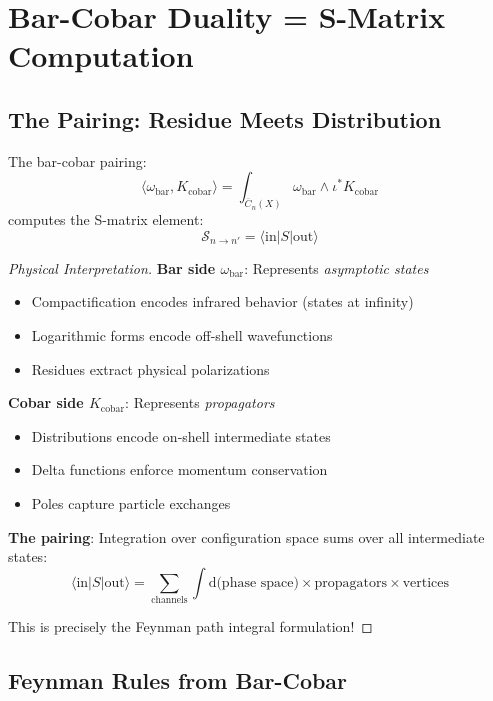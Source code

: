 \section{Bar-Cobar Duality = S-Matrix Computation}

\subsection{The Pairing: Residue Meets Distribution}

\begin{theorem}\label{thm:physical-pairing}
The bar-cobar pairing:
$$\langle \omega_{\text{bar}}, K_{\text{cobar}} \rangle = 
\int_{\overline{C}_n(X)} \omega_{\text{bar}} \wedge \iota^* K_{\text{cobar}}$$
computes the S-matrix element:
$$\mathcal{S}_{n \to n'} = \langle \text{in} | S | \text{out} \rangle$$
\end{theorem}

\begin{proof}[Physical Interpretation]
\textbf{Bar side $\omega_{\text{bar}}$}: Represents \emph{asymptotic states}
\begin{itemize}
\item Compactification encodes infrared behavior (states at infinity)
\item Logarithmic forms encode off-shell wavefunctions
\item Residues extract physical polarizations
\end{itemize}

\textbf{Cobar side $K_{\text{cobar}}$}: Represents \emph{propagators}
\begin{itemize}
\item Distributions encode on-shell intermediate states
\item Delta functions enforce momentum conservation
\item Poles capture particle exchanges
\end{itemize}

\textbf{The pairing}: Integration over configuration space sums over all 
intermediate states:
$$\langle \text{in} | S | \text{out} \rangle = 
\sum_{\text{channels}} \int \text{d(phase space)} \times \text{propagators} 
\times \text{vertices}$$

This is precisely the Feynman path integral formulation!
\end{proof}

\subsection{Feynman Rules from Bar-Cobar}

